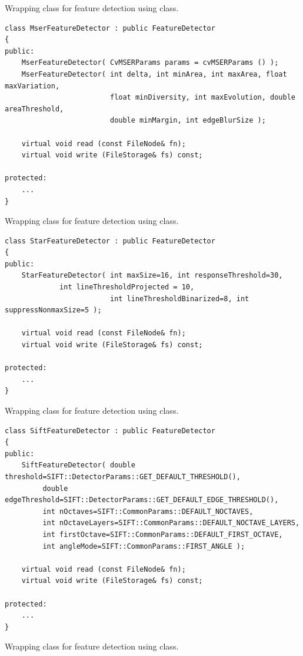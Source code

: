 Wrapping class for feature detection using  class.

\begin{lstlisting}
class MserFeatureDetector : public FeatureDetector
{
public:
    MserFeatureDetector( CvMSERParams params = cvMSERParams () );
    MserFeatureDetector( int delta, int minArea, int maxArea, float maxVariation,
                         float minDiversity, int maxEvolution, double areaThreshold,
                         double minMargin, int edgeBlurSize );
                         
    virtual void read (const FileNode& fn);
    virtual void write (FileStorage& fs) const;
    
protected:
	...
}
\end{lstlisting}

Wrapping class for feature detection using  class.

\begin{lstlisting}
class StarFeatureDetector : public FeatureDetector
{
public:
    StarFeatureDetector( int maxSize=16, int responseThreshold=30, 
			 int lineThresholdProjected = 10,
                         int lineThresholdBinarized=8, int suppressNonmaxSize=5 );
    
    virtual void read (const FileNode& fn);
    virtual void write (FileStorage& fs) const;
    
protected:
	...
}
\end{lstlisting}

Wrapping class for feature detection using  class.

\begin{lstlisting}
class SiftFeatureDetector : public FeatureDetector
{
public:
    SiftFeatureDetector( double threshold=SIFT::DetectorParams::GET_DEFAULT_THRESHOLD(),
		 double edgeThreshold=SIFT::DetectorParams::GET_DEFAULT_EDGE_THRESHOLD(),
		 int nOctaves=SIFT::CommonParams::DEFAULT_NOCTAVES,
		 int nOctaveLayers=SIFT::CommonParams::DEFAULT_NOCTAVE_LAYERS,
		 int firstOctave=SIFT::CommonParams::DEFAULT_FIRST_OCTAVE,
		 int angleMode=SIFT::CommonParams::FIRST_ANGLE );
    
    virtual void read (const FileNode& fn);
    virtual void write (FileStorage& fs) const;
    
protected:
	...
}
\end{lstlisting}

Wrapping class for feature detection using  class.

